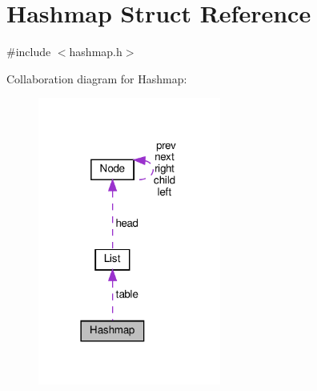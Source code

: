 \hypertarget{structHashmap}{}\section{Hashmap Struct Reference}
\label{structHashmap}


{\ttfamily \#include $<$hashmap.\+h$>$}



Collaboration diagram for Hashmap\+:
\nopagebreak
\begin{figure}[H]
\begin{center}
\leavevmode
\includegraphics[width=170pt]{structHashmap__coll__graph}
\end{center}
\end{figure}
